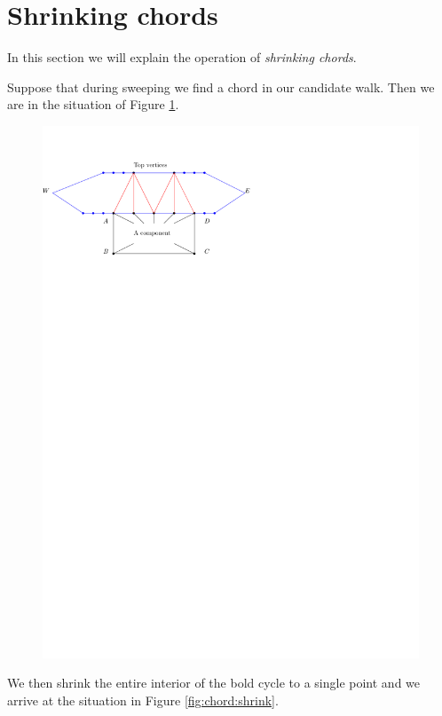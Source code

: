 
\section{Shrinking chords}
In this section we will explain the operation of \emph{shrinking chords}.


Suppose that during sweeping we find a chord  in our candidate walk. Then we are in the situation of Figure \ref{fig:chord:situation}.

\begin{figure}[h]
  \centering
  \includegraphics[scale=1]{chordShrink/img/situation}
  \caption{}
  \label{fig:chord:situation}
\end{figure}


We then shrink the entire interior of the bold  cycle to a single point and we arrive at the situation in Figure \ref{fig:chord:shrink}.

